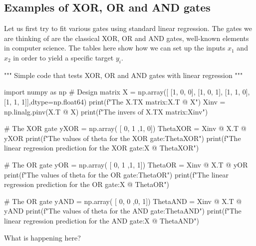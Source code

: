 \documentclass[%
oneside,                 %
final,                   %
10pt]{article}
\begin{document}
\subsection{Examples of XOR, OR and AND gates}

Let us first try to fit various gates using standard linear
regression. The gates we are thinking of are the classical XOR, OR and
AND gates, well-known elements in computer science. The tables here
show how we can set up the inputs $x_1$ and $x_2$ in order to yield a
specific target $y_i$.
































\bpycod
"""
Simple code that tests XOR, OR and AND gates with linear regression
"""

import numpy as np
# Design matrix
X = np.array([ [1, 0, 0], [1, 0, 1], [1, 1, 0],[1, 1, 1]],dtype=np.float64)
print(f"The X.TX  matrix:{X.T @ X}")
Xinv = np.linalg.pinv(X.T @ X)
print(f"The invers of X.TX  matrix:{Xinv}")

# The XOR gate 
yXOR = np.array( [ 0, 1 ,1, 0])
ThetaXOR  = Xinv @ X.T @ yXOR
print(f"The values of theta for the XOR gate:{ThetaXOR}")
print(f"The linear regression prediction  for the XOR gate:{X @ ThetaXOR}")


# The OR gate 
yOR = np.array( [ 0, 1 ,1, 1])
ThetaOR  = Xinv @ X.T @ yOR
print(f"The values of theta for the OR gate:{ThetaOR}")
print(f"The linear regression prediction  for the OR gate:{X @ ThetaOR}")


# The OR gate 
yAND = np.array( [ 0, 0 ,0, 1])
ThetaAND  = Xinv @ X.T @ yAND
print(f"The values of theta for the AND gate:{ThetaAND}")
print(f"The linear regression prediction  for the AND gate:{X @ ThetaAND}")

\epycod


What is happening here?

\end{document}

